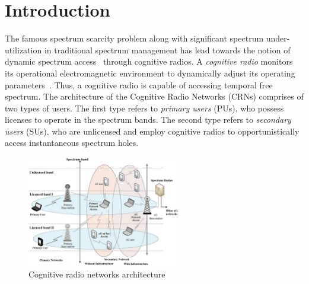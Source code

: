 \chapter{Introduction}\label{intro}
The famous spectrum scarcity problem along with significant spectrum under-utilization in traditional spectrum management has lead towards the notion of dynamic spectrum access~\cite{akyildiz2006next} through cognitive radios. A \textit{cognitive radio} monitors its operational electromagnetic environment to dynamically adjust its operating parameters~\cite{Mitola}. Thus, a cognitive radio is capable of accessing temporal free spectrum. The architecture of the Cognitive Radio Networks (CRNs) comprises of two types of users. The first type refers to \textit{primary users} (PUs), who possess licenses to operate in the spectrum bands. The second type refers to \textit{secondary users} (SUs), who are unlicensed and employ cognitive radios to opportunistically access instantaneous spectrum holes.

\begin{figure}[!htbp]
    \begin{center}
        \includegraphics[width=0.6\textwidth]{myFigures/cogArch.png}
        \caption{Cognitive radio networks architecture~\cite{bwnGatechProjectDescription}}
        \label{fig:cogArch}
    \end{center}
\end{figure}


